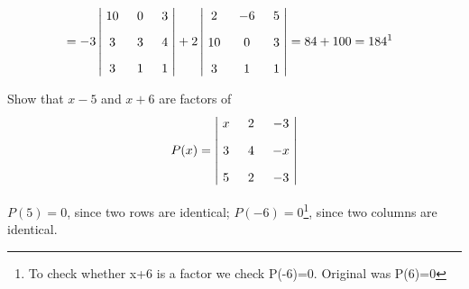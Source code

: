 \documentclass[11pt]{amsbook}
\begin{document}
\begin{hEnumerateArabic}
\begin{hSolution}
\begin{align*}
        \\%
        &= -3
        \begin{vmatrix}
            \xymatrix @R=3mm @C=3mm {
                10 &  0 &  3 \\
                 3 &  3 &  4 \\
                 3 &  1 &  1
            }
        \end{vmatrix}
        +2
        \begin{vmatrix}
            \xymatrix @R=3mm @C=3mm {
                 2 & -6 &  5 \\
                10 &  0 &  3 \\
                 3 &  1 &  1
            }
        \end{vmatrix}
        = 84 + 100 = 184 \text{\footnotemark}
    \end{align*}
    \end{hSolution}
    
    \setcounter{enumi}{5}
    \item Show that $x-5$ and $x+6$ are factors of
    \begin{align*}
        P(x) =
        \begin{vmatrix}
            \xymatrix @R=3mm @C=3mm {
                 x &  2 & -3 \\
                 3 &  4 & -x \\
                 5 &  2 & -3
            }
        \end{vmatrix}
    \end{align*}
    
    \begin{hSolution}
    \par $P(5) = 0$, since two rows are identical; $P(-6) = 0$\footnote{To check whether x+6 is a factor we check P(-6)=0. Original was P(6)=0}, since two columns are identical.
    \end{hSolution}
    

\end{hEnumerateArabic}
\end{document}
